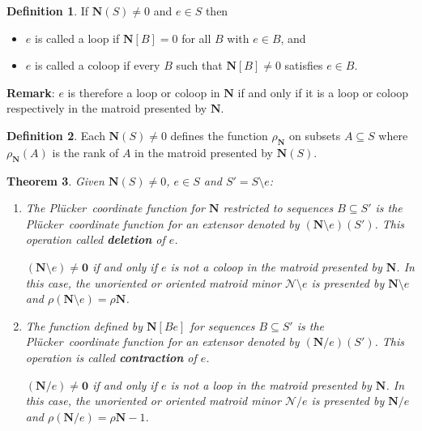 \documentclass[12pt]{article}
\newtheorem{theorem}{Theorem}[section]
\theoremstyle{definition}
\newtheorem{definition}[theorem]{Definition}
\newcommand{\Remark}{\textbf{Remark}}
\newcommand{\ext}[1]{\ensuremath{\mathbf{#1}}}
\newcommand{\Plucker}{Pl\"{u}cker\ }
\begin{document}
\begin{definition}
If $\ext{N}(S)\neq 0$ and $e\in S$ then
\begin{itemize}
\item
$e$ is called a loop if $\ext{N}[B]=0$ for all $B$ with $e\in B$, and
\item
$e$ is called a coloop if every $B$ such that $\ext{N}[B]\neq 0$ 
satisfies $e\in B$.
\end{itemize}
\end{definition}

\Remark: $e$ is therefore a loop or coloop in $\ext{N}$ if and only if
it is a loop or coloop respectively in the matroid presented by 
$\ext{N}$.

\begin{definition}
Each $\ext{N}(S)\neq 0$ defines the function $\rho_{\ext{N}}$ on
subsets $A\subseteq S$ where $\rho_{\ext{N}}(A)$ is the rank of $A$ in 
the matroid presented by $\ext{N}(S)$.
\end{definition}

\begin{theorem}
\label{ExtMinors}
Given $\ext{N}(S)\neq 0$, $e\in S$ and $S'=S\setminus e$:
\begin{enumerate}
\item The \Plucker coordinate function for $\ext{N}$ restricted to sequences
$B\subseteq S'$ is the \Plucker coordinate function for
an extensor denoted by $(\ext{N}\setminus e)(S')$.  
This operation called \textbf{deletion} of $e$.

$(\ext{N}\setminus e)\neq \ext{0}$ if and only if 
$e$ is not a coloop in the matroid presented by $\ext{N}$.
In this case,
the unoriented or oriented matroid minor $\mathcal{N}\setminus e$ 
is presented by $\ext{N}\setminus e$ and
$\rho(\ext{N}\setminus e) = \rho\ext{N}$.  

\item The function defined by $\ext{N}[Be]$ 
for sequences $B\subseteq S'$ is the \Plucker coordinate function for
an extensor denoted by $(\ext{N}/e)(S')$.  
This operation is called 
\textbf{contraction} of  $e$.

$(\ext{N}/e)\neq \ext{0}$ if and only if 
$e$ is not a loop in the matroid presented by $\ext{N}$.
In this case,
the unoriented or oriented matroid minor $\mathcal{N}/ e$ 
is presented by $\ext{N}/e$ and
$\rho(\ext{N}/ e) = \rho\ext{N}-1$.  

\end{enumerate}
\end{theorem}
\end{document}
